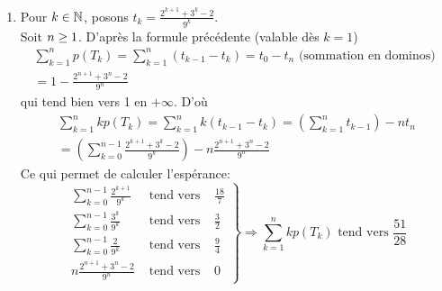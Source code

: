 \begin{enumerate}
\begin{enumerate}
\item Pour $k\in\mathbb{N}$, posons  $t_k= \frac{2^{k+1}+3^k-2}{9^k}$.\\
 Soit $n\geq1$. D'après la formule précédente (valable dès $k=1$)
\begin{multline*}
\sum_{k=1}^n p(T_k)=\sum_{k=1}^n\left(t_{k-1}-t_k\right)
=t_0-t_n \text{ (sommation en dominos) } \\
=1-\frac{2^{n+1}+3^n-2}{9^n}  
\end{multline*}
qui tend bien vers 1 en $+\infty$. D'où
\begin{multline*}
\sum_{k=1}^n kp(T_k)=\sum_{k=1}^n k(t_{k-1}-t_k)=\left(\sum_{k=1}^n t_{k-1}\right)-nt_n \\
  =\left(\sum_{k=0}^{n-1} \frac{2^{k+1}+3^k-2}{9^k}\right)-n\frac{2^{n+1}+3^n-2}{9^n}
\end{multline*}
Ce qui permet de calculer l'espérance:
\begin{displaymath}
\left. 
\begin{aligned}
\sum_{k=0}^{n-1} \frac{2^{k+1}}{9^k} &\text{ tend vers }& \frac{18}{7}\\
\sum_{k=0}^{n-1} \frac{3^{k}}{9^k} &\text{ tend vers }& \frac{3}{2}\\
\sum_{k=0}^{n-1} \frac{2}{9^k} &\text{ tend vers }& \frac{9}{4}\\
n\frac{2^{n+1}+3^n-2}{9^n} &\text{ tend vers }&  0
\end{aligned}
\right\rbrace \Rightarrow 
\sum_{k=1}^n kp(T_k)\text{ tend vers } \frac{51}{28}
\end{displaymath}
\end{enumerate}



\end{enumerate}
